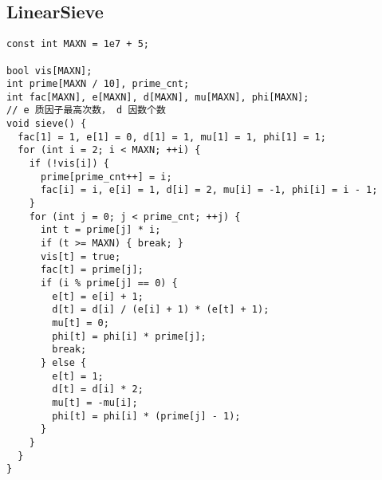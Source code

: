 \documentclass[twoside]{article}
\begin{document}
\subsection{LinearSieve}
\begin{lstlisting}
const int MAXN = 1e7 + 5;

bool vis[MAXN];
int prime[MAXN / 10], prime_cnt;
int fac[MAXN], e[MAXN], d[MAXN], mu[MAXN], phi[MAXN];
// e 质因子最高次数， d 因数个数
void sieve() {
  fac[1] = 1, e[1] = 0, d[1] = 1, mu[1] = 1, phi[1] = 1;
  for (int i = 2; i < MAXN; ++i) {
    if (!vis[i]) {
      prime[prime_cnt++] = i;
      fac[i] = i, e[i] = 1, d[i] = 2, mu[i] = -1, phi[i] = i - 1;
    }
    for (int j = 0; j < prime_cnt; ++j) {
      int t = prime[j] * i;
      if (t >= MAXN) { break; }
      vis[t] = true;
      fac[t] = prime[j];
      if (i % prime[j] == 0) {
        e[t] = e[i] + 1;
        d[t] = d[i] / (e[i] + 1) * (e[t] + 1);
        mu[t] = 0;
        phi[t] = phi[i] * prime[j];
        break;
      } else {
        e[t] = 1;
        d[t] = d[i] * 2;
        mu[t] = -mu[i];
        phi[t] = phi[i] * (prime[j] - 1);
      }
    }
  }
}

\end{lstlisting}
\end{document}
